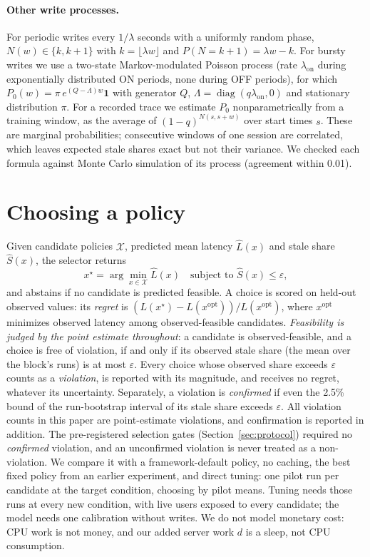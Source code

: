 \documentclass[acmsmall,review,nonacm]{acmart}
\begin{document}
\paragraph{Other write processes.}
For periodic writes every $1/\lambda$ seconds with a uniformly random phase, $N(w)\in\{k,k+1\}$ with $k=\lfloor \lambda w\rfloor$ and $P(N=k+1)=\lambda w-k$. For bursty writes we use a two-state Markov-modulated Poisson process (rate $\lambda_{\text{on}}$ during exponentially distributed ON periods, none during OFF periods), for which $P_0(w)=\pi\, e^{(Q-\Lambda)w}\mathbf{1}$ with generator $Q$, $\Lambda=\operatorname{diag}(q\lambda_{\text{on}},0)$ and stationary distribution $\pi$. For a recorded trace we estimate $P_0$ nonparametrically from a training window, as the average of $(1-q)^{N(s,s+w)}$ over start times $s$. These are marginal probabilities; consecutive windows of one session are correlated, which leaves expected stale shares exact but not their variance. We checked each formula against Monte Carlo simulation of its process (agreement within 0.01).

\section{Choosing a policy}
\label{sec:select}

Given candidate policies $\mathcal{X}$, predicted mean latency $\hat L(x)$ and stale share $\hat S(x)$, the selector returns
\[ x^\star = \arg\min_{x\in\mathcal{X}} \hat L(x) \quad \text{subject to } \hat S(x)\le\varepsilon, \]
and abstains if no candidate is predicted feasible. A choice is scored on held-out observed values: its \emph{regret} is $(L(x^\star)-L(x^{\text{opt}}))/L(x^{\text{opt}})$, where $x^{\text{opt}}$ minimizes observed latency among observed-feasible candidates. \emph{Feasibility is judged by the point estimate throughout}: a candidate is observed-feasible, and a choice is free of violation, if and only if its observed stale share (the mean over the block's runs) is at most $\varepsilon$. Every choice whose observed share exceeds $\varepsilon$ counts as a \emph{violation}, is reported with its magnitude, and receives no regret, whatever its uncertainty. Separately, a violation is \emph{confirmed} if even the 2.5\% bound of the run-bootstrap interval of its stale share exceeds $\varepsilon$. All violation counts in this paper are point-estimate violations, and confirmation is reported in addition. The pre-registered selection gates (Section~\ref{sec:protocol}) required no \emph{confirmed} violation, and an unconfirmed violation is never treated as a non-violation. We compare it with a framework-default policy, no caching, the best fixed policy from an earlier experiment, and direct tuning: one pilot run per candidate at the target condition, choosing by pilot means. Tuning needs those runs at every new condition, with live users exposed to every candidate; the model needs one calibration without writes. We do not model monetary cost: CPU work is not money, and our added server work $d$ is a sleep, not CPU consumption.
\end{document}
